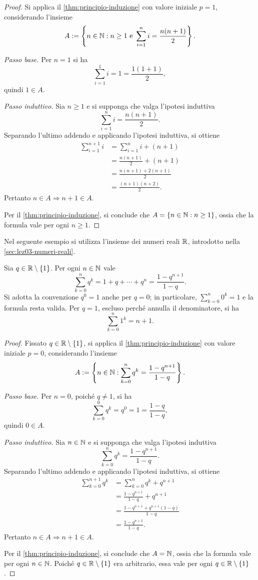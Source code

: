 \begin{proof}
Si applica il \cref{thm:principio-induzione} con valore
iniziale \(p=1\), considerando l'insieme
\[
  A:=\left\{n\in\mathbb{N}:n\ge1\text{ e }
    \sum_{i=1}^{n}i=\frac{n(n+1)}2\right\}.
\]

\emph{Passo base.}
Per \(n=1\) si ha
\[
  \sum_{i=1}^{1}i=1=\frac{1(1+1)}2,
\]
quindi \(1\in A\).

\emph{Passo induttivo.}
Sia \(n\ge1\) e si supponga che valga l'ipotesi induttiva
\[
  \sum_{i=1}^{n}i=\frac{n(n+1)}2.
\]
Separando l'ultimo addendo e applicando l'ipotesi induttiva,
si ottiene
\begin{align*}
  \sum_{i=1}^{n+1}i
    &=\sum_{i=1}^{n}i+(n+1)\\
    &=\frac{n(n+1)}2+(n+1)\\
    &=\frac{n(n+1)+2(n+1)}2\\
    &=\frac{(n+1)(n+2)}2.
\end{align*}
Pertanto \(n\in A\Longrightarrow n+1\in A\).

Per il \cref{thm:principio-induzione}, si conclude che
\(A=\{n\in\mathbb{N}:n\ge1\}\), ossia che la formula
vale per ogni \(n\ge1\).
\end{proof}

Nel seguente esempio si utilizza l'insieme dei numeri reali
\(\mathbb{R}\), introdotto nella \cref{sec:lez03-numeri-reali}.

\begin{example}
\label{ex:somma-geometrica-finita}
Sia \(q\in\mathbb{R}\setminus\{1\}\). Per ogni \(n\in\mathbb{N}\) vale
\[
  \sum_{k=0}^{n}q^k
  =1+q+\cdots+q^n
  =\frac{1-q^{n+1}}{1-q}.
\]
Si adotta la convenzione \(q^0=1\) anche per \(q=0\);
in particolare, \(\sum_{k=0}^n0^k=1\) e la formula resta valida.
Per \(q=1\), escluso perché annulla il denominatore, si ha
\[
  \sum_{k=0}^{n}1^k=n+1.
\]
\end{example}

\begin{proof}
Fissato \(q\in\mathbb{R}\setminus\{1\}\), si applica il
\cref{thm:principio-induzione} con valore iniziale \(p=0\),
considerando l'insieme
\[
  A:=\left\{n\in\mathbb{N}:
    \sum_{k=0}^{n}q^k=\frac{1-q^{n+1}}{1-q}\right\}.
\]

\emph{Passo base.}
Per \(n=0\), poiché \(q\ne1\), si ha
\[
  \sum_{k=0}^{0}q^k=q^0=1
  =\frac{1-q}{1-q},
\]
quindi \(0\in A\).

\emph{Passo induttivo.}
Sia \(n\in\mathbb{N}\) e si supponga che valga l'ipotesi induttiva
\[
  \sum_{k=0}^{n}q^k=\frac{1-q^{n+1}}{1-q}.
\]
Separando l'ultimo addendo e applicando l'ipotesi induttiva,
si ottiene
\begin{align*}
  \sum_{k=0}^{n+1}q^k
    &=\sum_{k=0}^{n}q^k+q^{n+1}\\
    &=\frac{1-q^{n+1}}{1-q}+q^{n+1}\\
    &=\frac{1-q^{n+1}+q^{n+1}(1-q)}{1-q}\\
    &=\frac{1-q^{n+2}}{1-q}.
\end{align*}
Pertanto \(n\in A\Longrightarrow n+1\in A\).

Per il \cref{thm:principio-induzione}, si conclude che
\(A=\mathbb{N}\), ossia che la formula vale per ogni \(n\in\mathbb{N}\).
Poiché \(q\in\mathbb{R}\setminus\{1\}\) era arbitrario,
essa vale per ogni \(q\in\mathbb{R}\setminus\{1\}\).
\end{proof}
